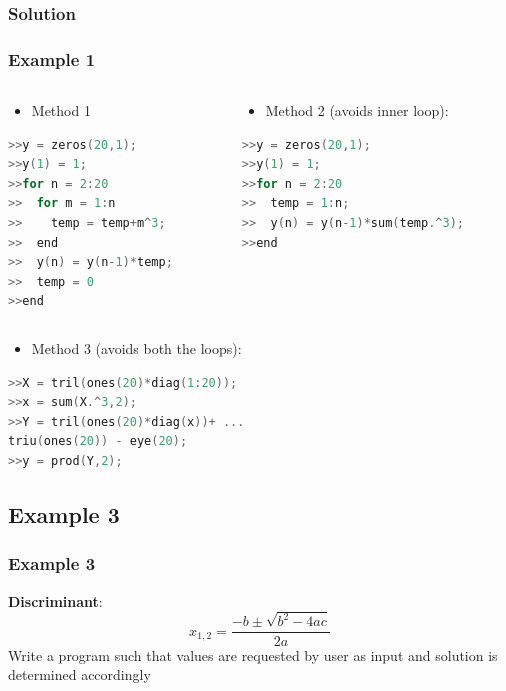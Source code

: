 \documentclass[hyperref={pdfpagelabels=true}]{beamer}
\begin{document}
\subsubsection{Solution}

\begin{frame}[fragile]
\frametitle{Example 1}
\begin{columns}
    \begin{column}{0.58\textwidth}
        \begin{itemize}
         \item[\ding{73}] Method 1 
         \end{itemize}
\begin{tcolorbox}
\scriptsize{
\begin{lstlisting}[language=C++,basicstyle=\ttfamily,keywordstyle=\color{red}]
>>y = zeros(20,1);
>>y(1) = 1;
>>for n = 2:20
>>  for m = 1:n
>>    temp = temp+m^3;
>>  end
>>  y(n) = y(n-1)*temp;
>>  temp = 0
>>end
\end{lstlisting} }
\end{tcolorbox}
      \end{column}
    \begin{column}{0.48\textwidth}
        \begin{itemize}
         \item[\ding{73}] Method 2 (avoids inner loop):
         \end{itemize}
\tiny{
\begin{lstlisting}[language=C++,basicstyle=\ttfamily,keywordstyle=\color{red}]
>>y = zeros(20,1);
>>y(1) = 1;
>>for n = 2:20
>>  temp = 1:n;
>>  y(n) = y(n-1)*sum(temp.^3);
>>end
\end{lstlisting}}
    \end{column}
\end{columns}
\begin{itemize}
         \item[\ding{71}] Method 3 (avoids both the loops):
         \end{itemize}
\begin{lstlisting}[language=C++,basicstyle=\ttfamily,keywordstyle=\color{red}]
>>X = tril(ones(20)*diag(1:20));
>>x = sum(X.^3,2);
>>Y = tril(ones(20)*diag(x))+ ...
triu(ones(20)) - eye(20);
>>y = prod(Y,2);
\end{lstlisting}
\end{frame}

\subsection{Example 3}
\begin{frame}
\frametitle{Example 3}
{\bf Discriminant}:
$$x_{1,2}=\frac{-b\pm\sqrt{b^2-4ac}}{2a}$$
Write a program such that values are requested by user as input and solution is determined accordingly 
\end{frame}
\end{document}
